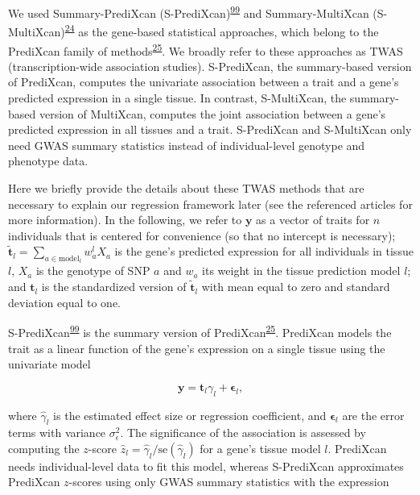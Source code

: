 \documentclass[
  a4paper,
]{article}
\newcommand{\bm}[1]{\boldsymbol{#1}}
\begin{document}
We used Summary-PrediXcan (S-PrediXcan)\textsuperscript{\protect\hyperlink{ref-vLyTudUB}{99}} and Summary-MultiXcan (S-MultiXcan)\textsuperscript{\protect\hyperlink{ref-1FFzCXo1s}{24}} as the gene-based statistical approaches, which belong to the PrediXcan family of methods\textsuperscript{\protect\hyperlink{ref-Z8bvDdVq}{25}}.
We broadly refer to these approaches as TWAS (transcription-wide association studies).
S-PrediXcan, the summary-based version of PrediXcan, computes the univariate association between a trait and a gene's predicted expression in a single tissue.
In contrast, S-MultiXcan, the summary-based version of MultiXcan, computes the joint association between a gene's predicted expression in all tissues and a trait.
S-PrediXcan and S-MultiXcan only need GWAS summary statistics instead of individual-level genotype and phenotype data.

Here we briefly provide the details about these TWAS methods that are necessary to explain our regression framework later (see the referenced articles for more information).
In the following, we refer to \(\mathbf{y}\) as a vector of traits for \(n\) individuals that is centered for convenience (so that no intercept is necessary);
\(\tilde{\mathbf{t}}_l = \sum_{a \in \mathrm{model}_l} w_{a}^{l} X_{a}\) is the gene's predicted expression for all individuals in tissue \(l\), \(X_a\) is the genotype of SNP \(a\) and \(w_{a}\) its weight in the tissue prediction model \(l\);
and \(\mathbf{t}_l\) is the standardized version of \(\tilde{\mathbf{t}}_l\) with mean equal to zero and standard deviation equal to one.

S-PrediXcan\textsuperscript{\protect\hyperlink{ref-vLyTudUB}{99}} is the summary version of PrediXcan\textsuperscript{\protect\hyperlink{ref-Z8bvDdVq}{25}}.
PrediXcan models the trait as a linear function of the gene's expression on a single tissue using the univariate model

\begin{equation}
\mathbf{y} = \mathbf{t}_l \gamma_l + \bm{\epsilon}_l,
\label{eq:predixcan}\end{equation}

where \(\hat{\gamma}_l\) is the estimated effect size or regression coefficient, and \(\bm{\epsilon}_l\) are the error terms with variance \(\sigma_{\epsilon}^{2}\).
The significance of the association is assessed by computing the \(z\)-score \(\hat{z}_{l}=\hat{\gamma}_l / \mathrm{se}(\hat{\gamma}_l)\) for a gene's tissue model \(l\).
PrediXcan needs individual-level data to fit this model, whereas S-PrediXcan approximates PrediXcan \(z\)-scores using only GWAS summary statistics with the expression
\end{document}
